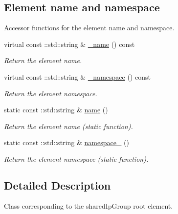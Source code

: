 \subsection*{Element name and namespace}
\label{_amgrpd4b5b61f6e07390f4af2465e04571f34}
Accessor functions for the element name and namespace. \begin{DoxyCompactItemize}
\item 
virtual const ::std::string \& \hyperlink{classopenstack_1_1xml_1_1SharedIpGroup___a7cf1a31079379802b55b7be0cafcda57}{\_\-name} () const 
\begin{DoxyCompactList}\small\item\em Return the element name. \item\end{DoxyCompactList}\item 
virtual const ::std::string \& \hyperlink{classopenstack_1_1xml_1_1SharedIpGroup___acd351c286b43d631654807bd94e071dc}{\_\-namespace} () const 
\begin{DoxyCompactList}\small\item\em Return the element namespace. \item\end{DoxyCompactList}\item 
static const ::std::string \& \hyperlink{classopenstack_1_1xml_1_1SharedIpGroup___a59d857a3393a67433f21d9778143fca0}{name} ()
\begin{DoxyCompactList}\small\item\em Return the element name (static function). \item\end{DoxyCompactList}\item 
static const ::std::string \& \hyperlink{classopenstack_1_1xml_1_1SharedIpGroup___a96c4c497dc5ae6772e53991d96b76799}{namespace\_\-} ()
\begin{DoxyCompactList}\small\item\em Return the element namespace (static function). \item\end{DoxyCompactList}\end{DoxyCompactItemize}


\subsection{Detailed Description}
Class corresponding to the sharedIpGroup root element. 


